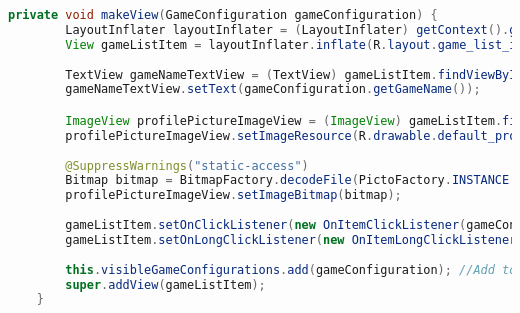 \begin{lstlisting}[language=java,firstnumber=1,caption={The method to create a list item - makeView},label=lst:makeview]
private void makeView(GameConfiguration gameConfiguration) {
        LayoutInflater layoutInflater = (LayoutInflater) getContext().getSystemService(Context.LAYOUT_INFLATER_SERVICE);
        View gameListItem = layoutInflater.inflate(R.layout.game_list_item, null); // Use same as profile
        
        TextView gameNameTextView = (TextView) gameListItem.findViewById(R.id.profileName);
        gameNameTextView.setText(gameConfiguration.getGameName());

        ImageView profilePictureImageView = (ImageView) gameListItem.findViewById(R.id.profilePic);
        profilePictureImageView.setImageResource(R.drawable.default_profile);
        
        @SuppressWarnings("static-access")
        Bitmap bitmap = BitmapFactory.decodeFile(PictoFactory.INSTANCE.getPictogram(super.getContext(),gameConfiguration.getStation(0).getCategory()).getImagePath());
        profilePictureImageView.setImageBitmap(bitmap);
        
        gameListItem.setOnClickListener(new OnItemClickListener(gameConfiguration));
        gameListItem.setOnLongClickListener(new OnItemLongClickListener(gameConfiguration));
        
        this.visibleGameConfigurations.add(gameConfiguration); //Add to list of visible configurations
        super.addView(gameListItem);
    }
\end{lstlisting}


